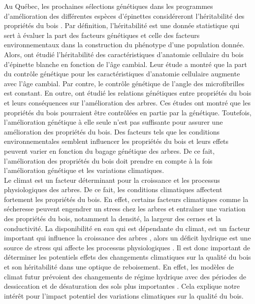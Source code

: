 \documentclass{report}
\begin{document}
Au Québec, les prochaines sélections génétiques dans les programmes d'amélioration des différentes espèces d'épinettes considéreront l'héritabilité des propriétés du bois \citep{Mullin2011, Beaulieu2009}. Par définition, l'héritabilité est une donnée statistique qui sert à évaluer la part des facteurs génétiques et celle des facteurs environnementaux dans la construction du phénotype d'une population donnée. Alors, \cite{Lenz2010} ont étudié l'héritabilité des caractéristiques d'anatomie cellulaire du bois d'épinette blanche en fonction de l'âge cambial. Leur étude a montré que la part du contrôle génétique pour les caractéristiques d'anatomie cellulaire augmente avec l'âge cambial. Par contre, le contrôle génétique de l'angle des microfibrilles est constant. En outre, \cite{Lenz2011} ont étudié les relations génétiques entre propriétés du bois et leurs conséquences sur l'amélioration des arbres. Ces études ont montré que les propriétés du bois pourraient être contrôlées en partie par la génétique. Toutefois, l'amélioration génétique à elle seule n'est pas suffisante pour assurer une amélioration des propriétés du bois. Des facteurs tels que les conditions environnementales semblent influencer les propriétés du bois et leurs effets peuvent varier en fonction du bagage génétique des arbres. De ce fait, l'amélioration des propriétés du bois doit prendre en compte à la fois l'amélioration génétique et les variations climatiques. \\

Le climat est un facteur déterminant pour la croissance et les processus physiologiques des arbres. De ce fait, les conditions climatiques affectent fortement les propriétés du bois. En effet, certains facteurs climatiques comme la sécheresse peuvent engendrer un stress chez les arbres et entraîner une variation des propriétés du bois, notamment la densité, la largeur des cernes et la conductivité. La disponibilité en eau qui est dépendante du climat, est un facteur important qui influence la croissance des arbres \citep{Lebourgeois2005}, alors un déficit hydrique est une source de stress qui affecte les processus physiologiques \citep{Waring1987}. Il est donc important de déterminer les potentiels effets des changements climatiques sur la qualité du bois et son héritabilité dans une optique de reboisement. En effet, les modèles de climat futur prévoient des changements de régime hydrique avec des périodes de dessiccation et de désaturation des sols plus importantes \citep{IPCC_2015}. Cela explique notre intérêt pour l'impact potentiel des variations climatiques sur la qualité du bois. \\
\end{document}
